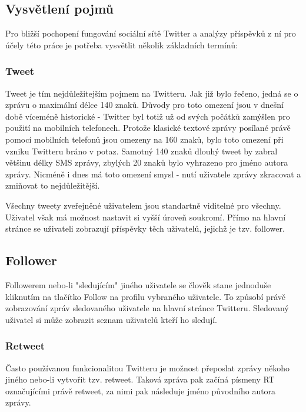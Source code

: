 \documentclass[thesis=B,czech]{FITthesis}[2012/06/26]
\begin{document}
\subsection{Vysvětlení pojmů}
Pro bližší pochopení fungování sociální sítě Twitter a analýzy příspěvků z ní pro účely této práce je potřeba vysvětlit několik základních termínů:

\subsubsection{Tweet}

Tweet je tím nejdůležitejším pojmem na Twitteru. Jak již bylo řečeno, jedná se o zprávu o maximální délce 140 znaků. Důvody pro toto omezení jsou v dnešní době víceméně historické - Twitter byl totiž už od svých počátků zamýšlen pro použití na mobilních telefonech. Protože klasické textové zprávy posílané právě pomocí mobilních telefonů jsou omezeny na 160 znaků, bylo toto omezení při vzniku Twitteru bráno v potaz. Samotný 140 znaků dlouhý tweet by zabral většinu délky SMS zprávy, zbylých 20 znaků bylo vyhrazeno pro jméno autora zprávy\cite{twitter-140}. Nicméně i dnes má toto omezení smysl - nutí uživatele zprávy zkracovat a zmiňovat to nejdůležitější. 

Všechny tweety zveřejněné uživatelem jsou standartně viditelné pro všechny. Uživatel však má možnost nastavit si vyšší úroveň soukromí. Přímo na hlavní stránce se uživateli zobrazují příspěvky těch uživatelů, jejichž je tzv. follower. 

\subsection{Follower}

	Followerem nebo-li "sledujícím" jiného uživatele se člověk stane jednoduše kliknutím na tlačítko Follow na profilu vybraného uživatele. To způsobí právě zobrazování zpráv sledovaného uživatele na hlavní stránce Twitteru. Sledovaný uživatel si může zobrazit seznam uživatelů kteří ho sledují. 


\subsubsection{Retweet}

	Často používanou funkcionalitou Twitteru je možnost přeposlat zprávy někoho jiného nebo-li vytvořit tzv. retweet. Taková zpráva pak začíná písmeny RT označujícími právě retweet, za nimi pak následuje jméno původního autora zprávy. 
\end{document}
